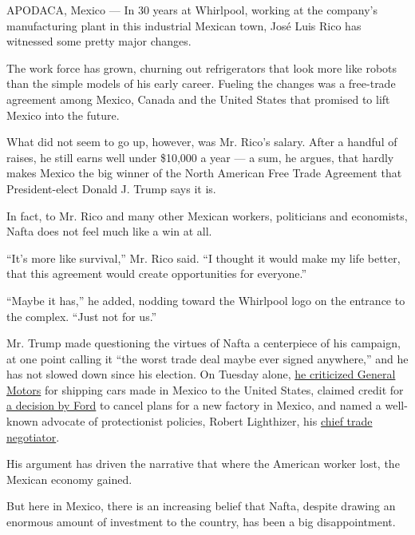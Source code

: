 APODACA, Mexico --- In 30 years at Whirlpool, working at the company's
manufacturing plant in this industrial Mexican town, José Luis Rico has
witnessed some pretty major changes.

The work force has grown, churning out refrigerators that look more like
robots than the simple models of his early career. Fueling the changes
was a free-trade agreement among Mexico, Canada and the United States
that promised to lift Mexico into the future.

What did not seem to go up, however, was Mr. Rico's salary. After a
handful of raises, he still earns well under \$10,000 a year --- a sum,
he argues, that hardly makes Mexico the big winner of the North American
Free Trade Agreement that President-elect Donald J. Trump says it is.

In fact, to Mr. Rico and many other Mexican workers, politicians and
economists, Nafta does not feel much like a win at all.

``It's more like survival,'' Mr. Rico said. ``I thought it would make my
life better, that this agreement would create opportunities for
everyone.''

``Maybe it has,'' he added, nodding toward the Whirlpool logo on the
entrance to the complex. ``Just not for us.''

Mr. Trump made questioning the virtues of Nafta a centerpiece of his
campaign, at one point calling it ``the worst trade deal maybe ever
signed anywhere,'' and he has not slowed down since his election. On
Tuesday alone,
\href{https://twitter.com/realDonaldTrump/status/816260343391514624}{he
criticized General Motors} for shipping cars made in Mexico to the
United States, claimed credit for
\href{https://www.nytimes.com/2017/01/03/business/ford-general-motors-trump.html?hp\&action=click\&pgtype=Homepage\&clickSource=story-heading\&module=first-column-region\&region=top-news\&WT.nav=top-news}{a
decision by Ford} to cancel plans for a new factory in Mexico, and named
a well-known advocate of protectionist policies, Robert Lighthizer, his
\href{https://www.nytimes.com/2017/01/03/us/politics/trump-robert-lighthizer-trade-mexico.html}{chief
trade negotiator}.

His argument has driven the narrative that where the American worker
lost, the Mexican economy gained.

But here in Mexico, there is an increasing belief that Nafta, despite
drawing an enormous amount of investment to the country, has been a big
disappointment.

